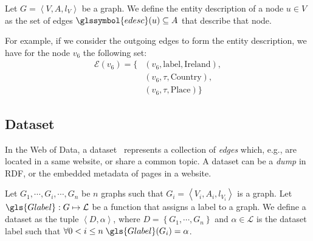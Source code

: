 \begin{definition}
Let $G = \left\langle V, A, l_V \right\rangle$ be a graph. We define the entity description of a node $u \in V$ as the set of edges $\glssymbol{edesc}(u) \subseteq A$ that describe that node.
\label{def:entity-description}
\end{definition}

For example, if we consider the outgoing edges to form the entity description, we have for the node $v_6$ the following set:
$$
\begin{aligned}
\mathcal{E}\left( v_6 \right) = \{ & \left( v_6, \text{label}, \text{Ireland} \right),\\
& \left( v_6, \tau, \text{Country} \right),\\
& \left( v_6, \tau, \text{Place} \right) \}
\end{aligned}
$$

\subsection{Dataset}
\label{sec:ssd:dataset}

In the Web of Data, a dataset~\cite{alexander:2009:dld} represents a collection of \emph{edges} which, e.g., are located in a same website, or share a common topic. A dataset can be a \emph{dump} in RDF, or the embedded metadata of pages in a website.

\begin{definition}[Dataset]
Let $G_1, \cdots, G_i, \cdots, G_n$ be $n$ graphs such that $G_i = \left\langle V_i, A_i, l_{V_i} \right\rangle$ is a graph.
Let $\gls{Glabel} : G \mapsto \mathcal{L}$ be a function that assigns a label to a graph.
We define a dataset as the tuple $\left\langle D, \alpha \right\rangle$, where $D = \left\lbrace G_1, \cdots, G_n \right\rbrace$ and $\alpha \in \mathcal{L}$ is the dataset label such that $\forall 0 < i \le n\; \gls{Glabel}(G_i) = \alpha$.
\end{definition}

